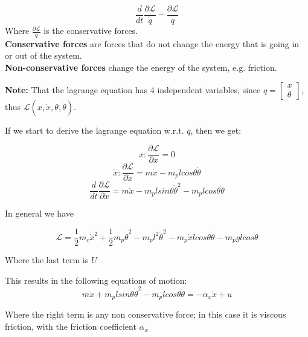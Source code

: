 \documentclass[a4paper]{article}
\begin{document}
\begin{equation}
\frac{d}{dt} \frac{\partial \mathcal{L}}{\dot{q}} - \frac{\partial \mathcal{L}}{q}
\end{equation}
Where $  \frac{\partial \mathcal{L}}{q} $ is the conservative forces. \vspace{5pt} \\
\textbf{Conservative forces} are forces that do not change the energy that is going in or out of the system. \vspace{5pt} \\
\textbf{Non-conservative forces} change the energy of the system, e.g. friction.  


\textbf{Note:} That the lagrange equation has 4 independent variables, since $ q = \begin{bmatrix}
x \\
\theta
\end{bmatrix} $, thus $ \mathcal{L}(x, \dot{x}, \theta, \dot{\theta }) $. 

 
If we start to derive the lagrange equation w.r.t. $ q $, then we get:

\[
x: \frac{\partial \mathcal{L} }{\partial x} = 0
\] 
\[
\dot{x}: \frac{\partial \mathcal{L} }{\partial \dot{x}} = m \dot{x} - m_p l cos \theta \dot{\theta}
\] 
\[
\frac{d}{dt} \frac{\partial \mathcal{L} }{\partial \dot{x}} = m \ddot{x} - m_p l sin \theta \dot{\theta}^{2} - m_p l cos \theta \ddot{\theta} 
\] 

In general we have \hfill {}

\begin{equation}
	\mathcal{L} = \frac{1}{2} m_c \dot{x}^{2} + \frac{1}{2} m_p \dot{\theta}^{2} -m_p l^{2} \dot{\theta}^{2} - m_p \dot{x} l cos \theta \dot{\theta} - m_p g l cos \theta
\end{equation}

Where the last term is $ U $

This results in the following equations of motion:
\begin{equation}
	m \ddot{x} + m_p l sin \theta \dot{\theta}^{2} - m_p l cos \theta \ddot{\theta} = - \alpha_x \dot{x} + u
\end{equation}

Where the right term is any non conservative force; in this case it is viscous friction, with the friction coefficient $ \alpha_x $
\end{document}
